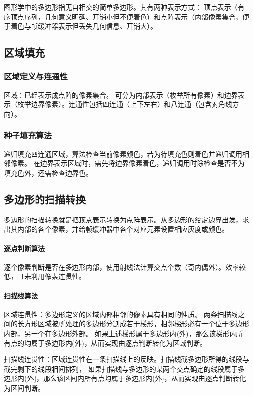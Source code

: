 \documentclass[12pt]{article}
\begin{document}
图形学中的多边形指无自相交的简单多边形。其有两种表示方式：
顶点表示（有序顶点序列，几何意义明确、开销小但不便着色）和点阵表示（内部像素集合，便于着色与帧缓冲器表示但丢失几何信息、开销大）。

\subsection{区域填充}

\subsubsection{区域定义与连通性}
区域：已经表示成点阵的像素集合。
可分为内部表示（枚举所有像素）和边界表示（枚举边界像素）。连通性包括四连通（上下左右）和八连通（包含对角线方向）。

\subsubsection{种子填充算法}
递归填充四连通区域，算法检查当前像素颜色，若为待填充色则着色并递归调用相邻像素。
在边界表示区域时，需先将边界像素着色，递归调用时除检查是否不为填充色外，还需检查边界色。

\subsection{多边形的扫描转换}

多边形的扫描转换就是把顶点表示转换为点阵表示。从多边形的给定边界出发，求出其内部的各个像素，并给帧缓冲器中各个对应元素设置相应灰度或颜色。

\paragraph{逐点判断算法}
逐个像素判断是否在多边形内部，使用射线法计算交点个数（奇内偶外）。效率较低，且未利用像素连贯性。

\paragraph{扫描线算法}
区域连贯性：多边形定义的区域内部相邻的像素具有相同的性质。
两条扫描线之间的长方形区域被所处理的多边形分割成若干梯形，相邻梯形必有一个位于多边形内部，另一个在多边形外部。
如果上述梯形属于多边形内(外)，那么该梯形内所有点的均属于多边形内(外)，从而实现由逐点判断转化为区域判断。

扫描线连贯性：区域连贯性在一条扫描线上的反映。扫描线截多边形所得的线段与截完剩下的线段相间排列，
如果扫描线与多边形的某两个交点确定的线段属于多边形内(外)，那么该区间内所有点均属于多边形内(外)，从而实现由逐点判断转化为区间判断。
\end{document}
